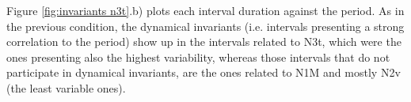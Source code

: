 Figure \ref{fig:invariants n3t}.b) plots each interval duration against the period. As in the previous condition, the dynamical invariants (i.e. intervals presenting a strong correlation to the period) show up in the intervals related to N3t, which were the ones presenting also the highest variability, whereas those intervals that do not participate in dynamical invariants, are the ones related to N1M and mostly N2v (the least variable ones). 




